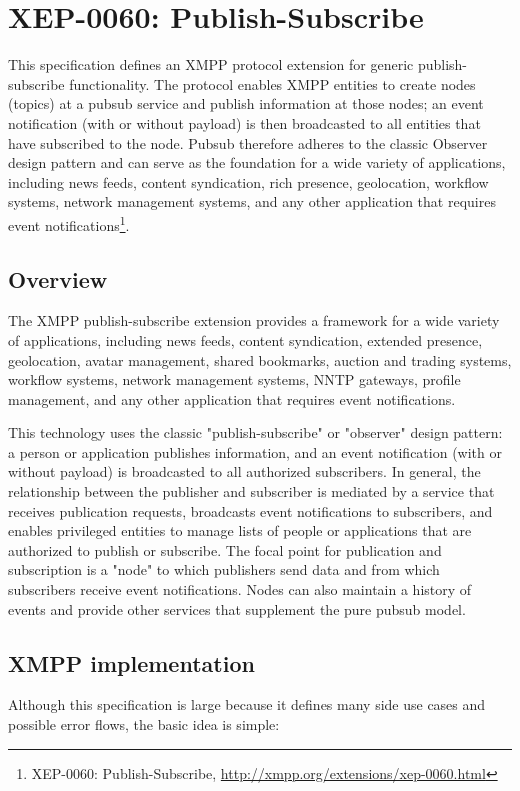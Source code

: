 \section{XEP-0060: Publish-Subscribe}
This specification defines an XMPP protocol extension for generic publish-subscribe functionality. The protocol enables XMPP entities to create nodes (topics) at a pubsub service and publish information at those nodes; an event notification (with or without payload) is then broadcasted to all entities that have subscribed to the node. Pubsub therefore adheres to the classic Observer design pattern and can serve as the foundation for a wide variety of applications, including news feeds, content syndication, rich presence, geolocation, workflow systems, network management systems, and any other application that requires event notifications\footnote{XEP-0060: Publish-Subscribe, \url{http://xmpp.org/extensions/xep-0060.html}}.

\subsection{Overview}
The XMPP publish-subscribe extension provides a framework for a wide variety of applications, including news feeds, content syndication, extended presence, geolocation, avatar management, shared bookmarks, auction and trading systems, workflow systems, network management systems, NNTP gateways, profile management, and any other application that requires event notifications.

This technology uses the classic "publish-subscribe" or "observer" design pattern: a person or application publishes information, and an event notification (with or without payload) is broadcasted to all authorized subscribers. In general, the relationship between the publisher and subscriber is mediated by a service that receives publication requests, broadcasts event notifications to subscribers, and enables privileged entities to manage lists of people or applications that are authorized to publish or subscribe. The focal point for publication and subscription is a "node" to which publishers send data and from which subscribers receive event notifications. Nodes can also maintain a history of events and provide other services that supplement the pure pubsub model.
   
	\subsection{XMPP implementation}
	Although this specification is large because it defines many side use cases and possible error flows, the basic idea is simple:

